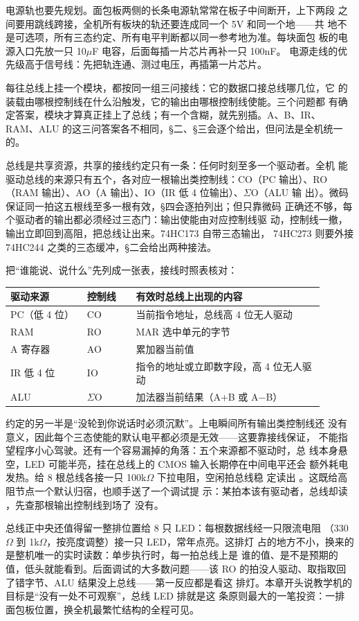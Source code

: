 电源轨也要先规划。面包板两侧的长条电源轨常常在板子中间断开，上下两段
之间要用跳线跨接，全机所有板块的轨还要连成同一个 5V 和同一个地——共
地不是可选项，所有三态约定、所有电平判断都以同一参考地为准。每块面包
板的电源入口先放一只 10$\mu$F 电容，后面每插一片芯片再补一只 100nF。
电源走线的优先级高于信号线：先把轨连通、测过电压，再插第一片芯片。

每往总线上挂一个模块，都按同一组三问接线：它的数据口接总线哪几位，它
的装载由哪根控制线在什么沿触发，它的输出由哪根控制线使能。三个问题都
有确定答案，模块才算真正挂上了总线；有一个含糊，就先别插。A、B、IR、
RAM、ALU 的这三问答案各不相同，§二、§三会逐个给出，但问法是全机统一
的。

总线是共享资源，共享的接线约定只有一条：任何时刻至多一个驱动者。全机
能驱动总线的来源只有五个，各对应一根输出类控制线：CO（PC 输出）、RO
（RAM 输出）、AO（A 输出）、IO（IR 低 4 位输出）、$\Sigma$O（ALU 输
出）。微码保证同一拍这五根线至多一根有效，§四会逐拍列出；但只靠微码
正确还不够，每个驱动者的输出都必须经过三态门：输出使能由对应控制线驱
动，控制线一撤，输出立即回到高阻，把总线让出来。74HC173 自带三态输出，
74HC273 则要外接 74HC244 之类的三态缓冲，§二会给出两种接法。

把“谁能说、说什么”先列成一张表，接线时照表核对：

\begin{longtable}{L{0.22\linewidth}L{0.14\linewidth}L{0.54\linewidth}}
\toprule
驱动来源 & 控制线 & 有效时总线上出现的内容 \\
\midrule
PC（低 4 位） & CO & 当前指令地址，总线高 4 位无人驱动 \\
RAM & RO & MAR 选中单元的字节 \\
A 寄存器 & AO & 累加器当前值 \\
IR 低 4 位 & IO & 指令的地址或立即数字段，高 4 位无人驱动 \\
ALU & $\Sigma$O & 加法器当前结果（A+B 或 A$-$B） \\
\bottomrule
\end{longtable}

约定的另一半是“没轮到你说话时必须沉默”。上电瞬间所有输出类控制线还
没有意义，因此每个三态使能的默认电平都必须是无效——这要靠接线保证，
不能指望程序小心驾驶。还有一个容易漏掉的角落：五个来源都不驱动时，总
线本身悬空，LED 可能半亮，挂在总线上的 CMOS 输入长期停在中间电平还会
额外耗电发热。给 8 根总线各接一只 100k$\Omega$ 下拉电阻，空闲拍总线稳
定读出 。这既给高阻节点一个默认归宿，也顺手送了一个调试提
示：某拍本该有驱动者，总线却读 ，先查那根输出控制线到场了
没有。

总线正中央还值得留一整排位置给 8 只 LED：每根数据线经一只限流电阻
（330$\Omega$ 到 1k$\Omega$，按亮度调整）接一只 LED，常年点亮。这排灯
占的地方不小，换来的是整机唯一的实时读数：单步执行时，每一拍总线上是
谁的值、是不是预期的值，低头就能看到。后面调试的大多数问题——该 RO
的拍没人驱动、取指取回了错字节、ALU 结果没上总线——第一反应都是看这
排灯。本章开头说教学机的目标是“没有一处不可观察”，总线 LED 排就是这
条原则最大的一笔投资：一排面包板位置，换全机最繁忙结构的全程可见。

